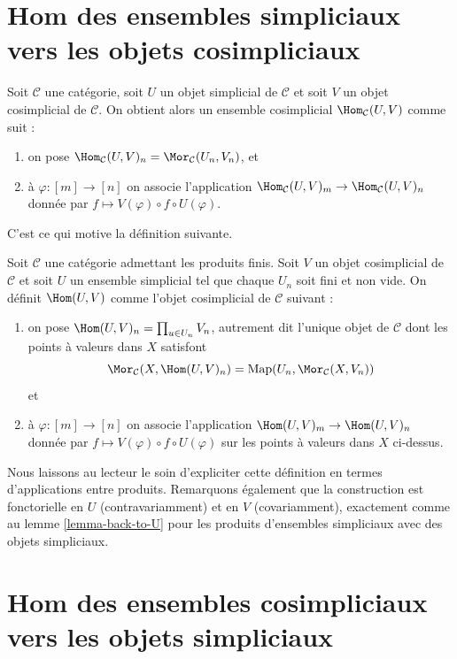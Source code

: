 \section{Hom des ensembles simpliciaux vers les objets cosimpliciaux}
\label{section-hom-from-simplicial-sets-into-cosimplicial}

\noindent
Soit $\mathcal{C}$ une catégorie, soit $U$ un objet simplicial de
$\mathcal{C}$ et soit $V$ un objet cosimplicial de $\mathcal{C}$.
On obtient alors un ensemble cosimplicial $\Hom_\mathcal{C}(U, V)$
comme suit :
\begin{enumerate}
\item on pose
$\Hom_\mathcal{C}(U, V)_n = \Mor_\mathcal{C}(U_n, V_n)$, et
\item à $\varphi : [m] \to [n]$ on associe l'application
$\Hom_\mathcal{C}(U, V)_m \to \Hom_\mathcal{C}(U, V)_n$
donnée par $f \mapsto V(\varphi) \circ f \circ U(\varphi)$.
\end{enumerate}
C'est ce qui motive la définition suivante.

\begin{definition}
\label{definition-hom-deltak-cosimplicial}
Soit $\mathcal{C}$ une catégorie admettant les produits finis. Soit $V$
un objet cosimplicial de $\mathcal{C}$ et soit $U$ un ensemble simplicial
tel que chaque $U_n$ soit fini et non vide. On définit
{\it $\Hom(U, V)$} comme l'objet cosimplicial de $\mathcal{C}$ suivant :
\begin{enumerate}
\item on pose $\Hom(U, V)_n = \prod_{u \in U_n} V_n$, autrement dit
l'unique objet de $\mathcal{C}$ dont les points à valeurs dans $X$
satisfont
$$
\Mor_\mathcal{C}(X, \Hom(U, V)_n)
=
\text{Map}(U_n, \Mor_\mathcal{C}(X, V_n))
$$
et
\item à $\varphi : [m] \to [n]$ on associe l'application
$\Hom(U, V)_m \to \Hom(U, V)_n$
donnée par $f \mapsto V(\varphi) \circ f \circ U(\varphi)$ sur les
points à valeurs dans $X$ ci-dessus.
\end{enumerate}
\end{definition}

\noindent
Nous laissons au lecteur le soin d'expliciter cette définition en termes
d'applications entre produits. Remarquons également que la construction est
fonctorielle en $U$ (contravariamment) et en $V$ (covariamment), exactement
comme au lemme \ref{lemma-back-to-U} pour les produits d'ensembles
simpliciaux avec des objets simpliciaux.




\section{Hom des ensembles cosimpliciaux vers les objets simpliciaux}
\label{section-hom-from-cosimplicial-sets-into-simplicial}

